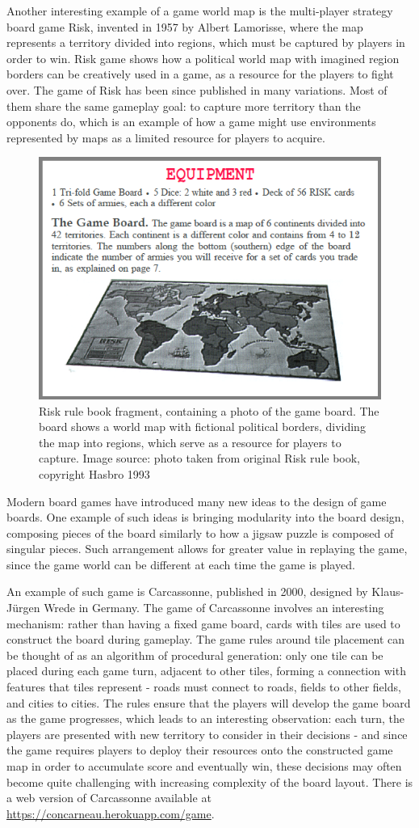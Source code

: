 \documentclass[12pt]{report}
\begin{document}
Another interesting example of a game world map is the multi-player strategy board game Risk, invented in 1957 by Albert Lamorisse, where the map represents a territory divided into regions, which must be captured by players in order to win. Risk game shows how a political world map with imagined region borders can be creatively used in a game, as a resource for the players to fight over. The game of Risk has been since published in many variations. Most of them share the same gameplay goal: to capture more territory than the opponents do, which is an example of how a game might use environments represented by maps as a limited resource for players to acquire.
 
\begin{figure}[h]
	\centering
	\includegraphics[width=0.5\linewidth]{images/risk-rulebook} 
	\caption{Risk rule book fragment, containing a photo of the game board. The board shows a world map with fictional political borders, dividing the map into regions, which serve as a resource for players to capture. Image source: photo taken from original Risk rule book, copyright Hasbro 1993}
	\label{fig:acrord32risk1}
\end{figure}

Modern board games have introduced many new ideas to the design of game boards. One example of such ideas is bringing modularity into the board design, composing pieces of the board similarly to how a jigsaw puzzle is composed of singular pieces. Such arrangement allows for greater value in replaying the game, since the game world can be different at each time the game is played. 

An example of such game is Carcassonne, published in 2000, designed by Klaus-Jürgen Wrede in Germany. The game of Carcassonne involves an interesting mechanism: rather than having a fixed game board, cards with tiles are used to construct the board during gameplay. The game rules around tile placement can be thought of as an algorithm of procedural generation: only one tile can be placed during each game turn, adjacent to other tiles, forming a connection with features that tiles represent - roads must connect to roads, fields to other fields, and cities to cities. The rules ensure that the players will develop the game board as the game progresses, which leads to an interesting observation: each turn, the players are presented with new territory to consider in their decisions - and since the game requires players to deploy their resources onto the constructed game map in order to accumulate score and eventually win, these decisions may often become quite challenging with increasing complexity of the board layout. There is a web version of Carcassonne available at \url{https://concarneau.herokuapp.com/game}.
\end{document}
